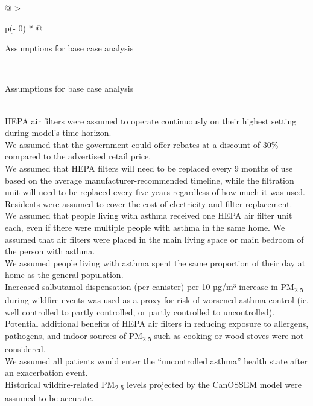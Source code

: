 \documentclass[
  number]{elsarticle}
\begin{document}
\hypertarget{tbl-assumptions}{}
\begin{longtable}[]{@{}
  >{\raggedright\arraybackslash}p{(\columnwidth - 0\tabcolsep) * }@{}}
\caption{\label{tbl-assumptions}Model assumptions for evaluating
cost-effectiveness of a portable air filter rebate program to prevent
asthma exacerbations}\tabularnewline
\toprule\noalign{}
\begin{minipage}[b]{\linewidth}\raggedright
Assumptions for base case analysis
\end{minipage} \\
\midrule\noalign{}
\endfirsthead
\toprule\noalign{}
\begin{minipage}[b]{\linewidth}\raggedright
Assumptions for base case analysis
\end{minipage} \\
\midrule\noalign{}
\endhead
\bottomrule\noalign{}
\endlastfoot
HEPA air filters were assumed to operate continuously on their highest
setting during model's time horizon. \\
We assumed that the government could offer rebates at a discount of 30\%
compared to the advertised retail price. \\
We assumed that HEPA filters will need to be replaced every 9 months of
use based on the average manufacturer-recommended timeline, while the
filtration unit will need to be replaced every five years regardless of
how much it was used. \\
Residents were assumed to cover the cost of electricity and filter
replacement. \\
We assumed that people living with asthma received one HEPA air filter
unit each, even if there were multiple people with asthma in the same
home. We assumed that air filters were placed in the main living space
or main bedroom of the person with asthma. \\
We assumed people living with asthma spent the same proportion of their
day at home as the general population. \\
Increased salbutamol dispensation (per canister) per 10 µg/m³ increase
in PM\textsubscript{2.5} during wildfire events was used as a proxy for
risk of worsened asthma control (ie. well controlled to partly
controlled, or partly controlled to uncontrolled). \\
Potential additional benefits of HEPA air filters in reducing exposure
to allergens, pathogens, and indoor sources of PM\textsubscript{2.5}
such as cooking or wood stoves were not considered. \\
We assumed all patients would enter the ``uncontrolled asthma'' health
state after an exacerbation event. \\
Historical wildfire-related PM\textsubscript{2.5} levels projected by
the CanOSSEM model were assumed to be accurate. \\
\end{longtable}
\end{document}
